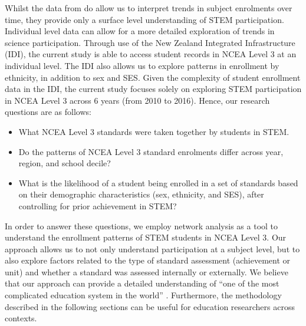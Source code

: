 \documentclass[a4paper]{article}
\begin{document}
Whilst the data from \cite{EducationCounts_2018} do allow us to interpret trends in subject enrolments over time, they provide only a surface level understanding of STEM participation. Individual level data can allow for a more detailed exploration of trends in science participation. Through use of the New Zealand Integrated Infrastructure (IDI), the current study is able to access student records in NCEA Level 3 at an individual level. The IDI also allows us to explore patterns in enrollment by ethnicity, in addition to sex and SES. Given the complexity of student enrollment data in the IDI, the current study focuses solely on exploring STEM participation in NCEA Level 3 across 6 years (from 2010 to 2016). Hence, our research questions are as follows:
\begin{itemize}
    \item What NCEA Level 3 standards were taken together by students in STEM.
    \item Do the patterns of NCEA Level 3 standard enrolments differ across year, region, and school decile?
    \item What is the likelihood of a student being enrolled in a set of standards based on their demographic characteristics (sex, ethnicity, and SES), after controlling for prior achievement in STEM?
\end{itemize}

In order to answer these questions, we employ network analysis as a tool to understand the enrollment patterns of STEM students in NCEA Level 3. Our approach allows us to not only understand participation at a subject level, but to also explore factors related to the type of standard assessment (achievement or unit) and whether a standard was assessed internally or externally. We believe that our approach can provide a detailed understanding of ``one of the most complicated education system in the world'' \cite{hipkins2016ncea}. Furthermore, the methodology described in the following sections can be useful for education researchers across contexts. 
\end{document}
